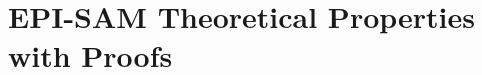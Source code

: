 \documentclass[letterpaper]{article} %
\newcommand{\eff}{\textit{eff}}
\newcommand{\iseff}{\textit{IsEff}}
\newcommand{\ispre}{\textit{IsPre}}
\begin{document}




\setcounter{AlgoLine}{0}
\section{EPI-SAM Theoretical Properties with Proofs}
\end{document}
